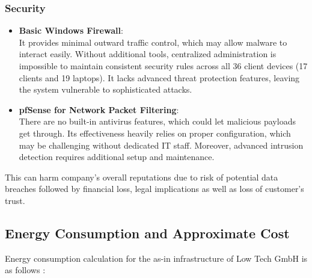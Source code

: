\documentclass{llncs}
\begin{document}
\subsubsection*{Security}
\begin{itemize}
  \item \textbf{Basic Windows Firewall}:
        \\
        It provides minimal outward traffic control, which may allow malware to interact easily. 
        Without additional tools, centralized administration is impossible to maintain consistent security rules across all 36 client devices (17 clients and 19 laptops).
        It lacks advanced threat protection features, leaving the system vulnerable to sophisticated attacks.
        \\
  \item \textbf{pfSense for Network Packet Filtering}:
        \\ 
        There are no built-in antivirus features, which could let malicious payloads get through. Its effectiveness heavily relies on proper configuration, which may be challenging without dedicated IT staff.
        Moreover, advanced intrusion detection requires additional setup and maintenance.
        \\
        
\end{itemize}
This can harm company's overall reputations due to risk of potential data breaches followed by financial loss, legal implications as well as loss of customer's trust.
\subsection{Energy Consumption and Approximate Cost}

Energy consumption calculation for the as-in infrastructure of Low Tech GmbH is as follows : 
\end{document}
